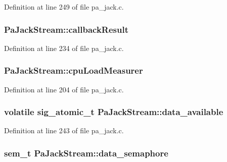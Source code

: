Definition at line 249 of file pa\+\_\+jack.\+c.

\subsubsection[{\texorpdfstring{callback\+Result}{callbackResult}}]{ Pa\+Jack\+Stream\+::callback\+Result}\hypertarget{struct_pa_jack_stream_ab747beccc47f95be5295d848f138bd73}{}\label{struct_pa_jack_stream_ab747beccc47f95be5295d848f138bd73}


Definition at line 234 of file pa\+\_\+jack.\+c.

\subsubsection[{\texorpdfstring{cpu\+Load\+Measurer}{cpuLoadMeasurer}}]{ Pa\+Jack\+Stream\+::cpu\+Load\+Measurer}\hypertarget{struct_pa_jack_stream_af3286d0df7ea86579aeaeb0f81d559e8}{}\label{struct_pa_jack_stream_af3286d0df7ea86579aeaeb0f81d559e8}


Definition at line 204 of file pa\+\_\+jack.\+c.

\subsubsection[{\texorpdfstring{data\+\_\+available}{data_available}}]{\setlength{\rightskip}{0pt plus 5cm}volatile sig\+\_\+atomic\+\_\+t Pa\+Jack\+Stream\+::data\+\_\+available}\hypertarget{struct_pa_jack_stream_a821d97c864a8ef77b6ceb221e747019b}{}\label{struct_pa_jack_stream_a821d97c864a8ef77b6ceb221e747019b}


Definition at line 243 of file pa\+\_\+jack.\+c.

\subsubsection[{\texorpdfstring{data\+\_\+semaphore}{data_semaphore}}]{\setlength{\rightskip}{0pt plus 5cm}sem\+\_\+t Pa\+Jack\+Stream\+::data\+\_\+semaphore}\hypertarget{struct_pa_jack_stream_a128e233cdb75f07e72937e7ae577d0f1}{}\label{struct_pa_jack_stream_a128e233cdb75f07e72937e7ae577d0f1}


